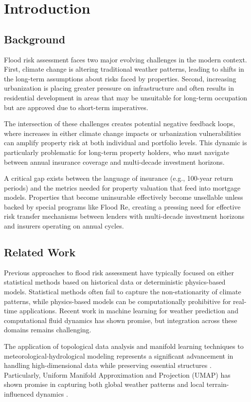 \documentclass{article}
\begin{document}
\clearpage
\section{Introduction}
\subsection{Background}
Flood risk assessment faces two major evolving challenges in the modern context. First, climate change is altering traditional weather patterns, leading to shifts in the long-term assumptions about risks faced by properties. Second, increasing urbanization is placing greater pressure on infrastructure and often results in residential development in areas that may be unsuitable for long-term occupation but are approved due to short-term imperatives.

The intersection of these challenges creates potential negative feedback loops, where increases in either climate change impacts or urbanization vulnerabilities can amplify property risk at both individual and portfolio levels. This dynamic is particularly problematic for long-term property holders, who must navigate between annual insurance coverage and multi-decade investment horizons.

A critical gap exists between the language of insurance (e.g., 100-year return periods) and the metrics needed for property valuation that feed into mortgage models. Properties that become uninsurable effectively become unsellable unless backed by special programs like Flood Re, creating a pressing need for effective risk transfer mechanisms between lenders with multi-decade investment horizons and insurers operating on annual cycles.

\subsection{Related Work}
Previous approaches to flood risk assessment have typically focused on either statistical methods based on historical data or deterministic physics-based models. Statistical methods often fail to capture the non-stationarity of climate patterns, while physics-based models can be computationally prohibitive for real-time applications. Recent work in machine learning for weather prediction \cite{racah2017} and computational fluid dynamics \cite{bates2010} has shown promise, but integration across these domains remains challenging.

The application of topological data analysis and manifold learning techniques to meteorological-hydrological modeling represents a significant advancement in handling high-dimensional data while preserving essential structures \cite{lakshmanan2023}. Particularly, Uniform Manifold Approximation and Projection (UMAP) has shown promise in capturing both global weather patterns and local terrain-influenced dynamics \cite{mcinnes2018}.
\end{document}
